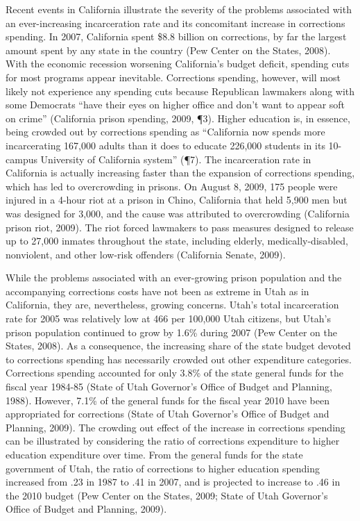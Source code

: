 Recent events in California illustrate the severity of the problems associated with an ever-increasing incarceration rate and its concomitant increase in corrections spending.  In 2007, California spent \$8.8 billion on corrections, by far the largest amount spent by any state in the country (Pew Center on the States, 2008).  With the economic recession worsening California's budget deficit, spending cuts for most programs appear inevitable.  Corrections spending, however, will most likely not experience any spending cuts because Republican lawmakers along with some Democrats ``have their eyes on higher office and don't want to appear soft on crime'' (California prison spending, 2009, \P 3).  Higher education is, in essence, being crowded out by corrections spending as ``California now spends more incarcerating 167,000 adults than it does to educate 226,000 students in its 10-campus University of California system'' (\P 7).  The incarceration rate in California is actually increasing faster than the expansion of corrections spending, which has led to overcrowding in prisons.  On August 8, 2009, 175 people were injured in a 4-hour riot at a prison in Chino, California that held 5,900 men but was designed for 3,000, and the cause was attributed to overcrowding (California prison riot, 2009).  The riot forced lawmakers to pass measures designed to release up to 27,000 inmates throughout the state, including elderly, medically-disabled, nonviolent, and other low-risk offenders (California Senate, 2009).

While the problems associated with an ever-growing prison population and the accompanying corrections costs have not been as extreme in Utah as in California, they are, nevertheless, growing concerns.  Utah's total incarceration rate for 2005 was relatively low at 466 per 100,000 Utah citizens, but Utah's prison population continued to grow by 1.6\% during 2007 (Pew Center on the States, 2008).  As a consequence, the increasing share of the state budget devoted to corrections spending has necessarily crowded out other expenditure categories.  Corrections spending accounted for only 3.8\% of the state general funds for the fiscal year 1984-85 (State of Utah Governor's Office of Budget and Planning, 1988).  However, 7.1\% of the general funds for the fiscal year 2010 have been appropriated for corrections (State of Utah Governor's Office of Budget and Planning, 2009).  The crowding out effect of the increase in corrections spending can be illustrated by considering the ratio of corrections expenditure to higher education expenditure over time.  From the general funds for the state government of Utah, the ratio of corrections to higher education spending increased from .23 in 1987 to .41 in 2007, and is projected to increase to .46 in the 2010 budget (Pew Center on the States, 2009; State of Utah Governor's Office of Budget and Planning, 2009).

